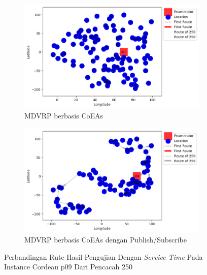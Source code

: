 \begin{figure}[H]
	\centering
	\begin{subfigure}[t]{\textwidth}
		\centering
		\includegraphics[width=\textwidth]{Resources/Images/cordeau_p09_tw/cordeau_p09_tw_250_coes}
		\caption{MDVRP berbasis CoEAs}
		\label{fig:cordeau_p09_tw_250_coes}
	\end{subfigure}
	\begin{subfigure}[t]{\textwidth}
		\centering
		\includegraphics[width=\textwidth]{Resources/Images/cordeau_p09_tw/cordeau_p09_tw_250_pubsub_coes}
		\caption{MDVRP berbasis CoEAs dengan Publish/Subscribe}
		\label{fig:cordeau_p09_tw_250_pubsub_coes}
	\end{subfigure}
	\caption{Perbandingan Rute Hasil Pengujian Dengan \textit{Service Time} Pada Instance Cordeau p09 Dari Pencacah 250}
	\label{fig:cordeau_p09_tw_250}
\end{figure}


